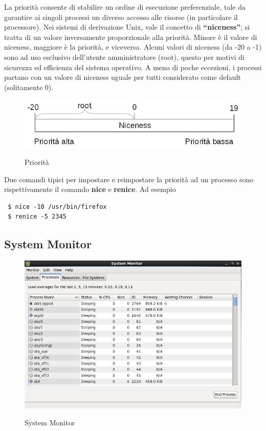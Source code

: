 La priorità consente di stabilire un ordine di esecuzione preferenziale, tale da garantire ai singoli processi un diverso accesso alle risorse (in particolare il processore). Nei sistemi di derivazione Unix, vale il concetto di \textbf{``niceness''}; si tratta di un valore inversamente proporzionale alla priorità. Minore è il valore di niceness, maggiore è la priorità, e viceversa. 
Alcuni valori di niceness (da -20 a -1) sono ad uso esclusivo dell'utente amministratore (root), questo per motivi di sicurezza ed efficienza del sistema operativo.  A meno di poche eccezioni, i processi partano con un valore di niceness uguale per tutti considerato come default (solitamente 0).

\begin{figure}[!ht]
 \centering
 \includegraphics[scale=0.65]{Immagini/niceness.png}
 \label{fig:Niceness}
 \caption{Priorità}
\end{figure}

Due comandi tipici per impostare e reimpostare la priorità ad un processo sono rispettivamente il comando \textbf{nice} e \textbf{renice}. Ad esempio

\begin{verbatim}
 $ nice -10 /usr/bin/firefox
 $ renice -5 2345
\end{verbatim}


\subsection{System Monitor}

\begin{figure}[!ht]
 \centering
 \includegraphics[scale=0.4]{Immagini/sys_mon1.png}
 \label{fig:System Monitor}
 \caption{System Monitor}
\end{figure}

